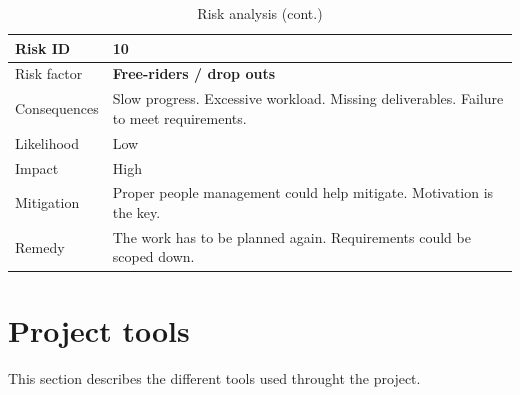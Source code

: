 \begin{table}[h]
\begin{tabular}{ | l | p{11.5cm} | }
  
  Risk ID & \textbf{10} \\
  \hline\noalign{\smallskip}\hline
  Risk factor   & \textbf{Free-riders / drop outs} \\
  Consequences  & Slow progress. Excessive workload. Missing deliverables. Failure to meet requirements. \\
  Likelihood    & Low \\
  Impact        & High \\
  Mitigation    & Proper people management could help mitigate. \newline
                  Motivation is the key. \\
  Remedy        & The work has to be planned again. \newline
                  Requirements could be scoped down. \\
  \hline

\end{tabular}
\caption{Risk analysis (cont.)}
\end{table}

\clearpage
\section{Project tools}
\label{section:tools}
This section describes the different tools used throught the project.

